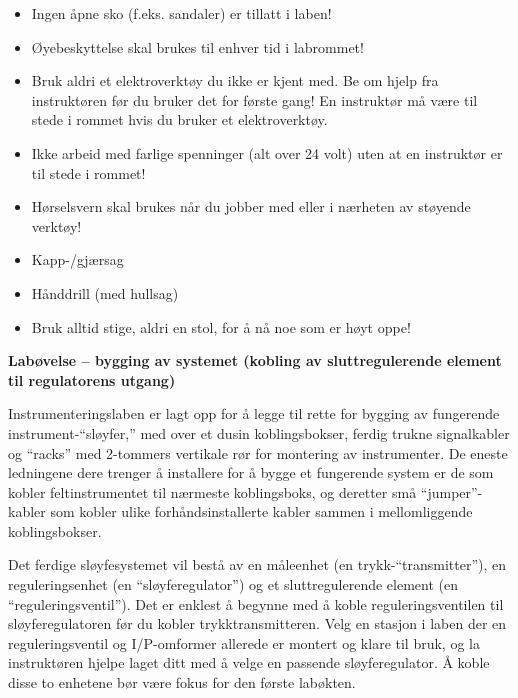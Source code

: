 \begin{itemize}
\item{} Ingen åpne sko (f.eks. sandaler) er tillatt i laben!
\vskip 10pt
\item{} Øyebeskyttelse skal brukes til enhver tid i labrommet!
\vskip 10pt
\item{} Bruk aldri et elektroverktøy du ikke er kjent med.  Be om hjelp fra instruktøren før du bruker det for første gang!  En instruktør må være til stede i rommet hvis du bruker et elektroverktøy.
\vskip 10pt
\item{} Ikke arbeid med farlige spenninger (alt over 24 volt) uten at en instruktør er til stede i rommet!
\vskip 10pt
\item{} Hørselsvern skal brukes når du jobber med eller i nærheten av støyende verktøy!
\item{} Kapp-/gjærsag
\item{} Hånddrill (med hullsag)
\vskip 10pt
\item{} Bruk alltid stige, aldri en stol, for å nå noe som er høyt oppe!
\end{itemize}








\vfil \eject

\noindent
{\bf Labøvelse -- bygging av systemet (kobling av sluttregulerende element til regulatorens utgang)}

\vskip 5pt

Instrumenteringslaben er lagt opp for å legge til rette for bygging av fungerende instrument-``sløyfer,'' med over et dusin koblingsbokser, ferdig trukne signalkabler og ``racks'' med 2-tommers vertikale rør for montering av instrumenter.  De eneste ledningene dere trenger å installere for å bygge et fungerende system er de som kobler feltinstrumentet til nærmeste koblingsboks, og deretter små ``jumper''-kabler som kobler ulike forhåndsinstallerte kabler sammen i mellomliggende koblingsbokser.


Det ferdige sløyfesystemet vil bestå av en måleenhet (en trykk-``transmitter''), en reguleringsenhet (en ``sløyferegulator'') og et sluttregulerende element (en ``reguleringsventil'').  Det er enklest å begynne med å koble reguleringsventilen til sløyferegulatoren før du kobler trykktransmitteren.  Velg en stasjon i laben der en reguleringsventil og I/P-omformer allerede er montert og klare til bruk, og la instruktøren hjelpe laget ditt med å velge en passende sløyferegulator.  Å koble disse to enhetene bør være fokus for den første labøkten.

